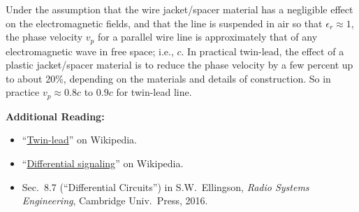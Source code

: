 Under the assumption that the wire jacket/spacer material has a negligible effect on the electromagnetic fields, and that the line is suspended in air so that 
$\epsilon_r\approx 1$, the phase velocity $v_p$ for a parallel wire line is approximately that of any electromagnetic wave in free space; i.e., $c$.  In practical twin-lead, the effect of a plastic jacket/spacer material is to reduce the phase velocity by a few percent up to about 20\%, depending on the materials and details of construction.  So in practice $v_p\approx 0.8c$ to $0.9c$ for twin-lead line.  


{\bf Additional Reading:}
\begin{itemize}
\item ``\href{https://en.wikipedia.org/wiki/Twin-lead}{Twin-lead}'' on Wikipedia.
\item ``\href{https://en.wikipedia.org/wiki/Differential_signaling}{Differential signaling}'' on Wikipedia.
\item Sec.~8.7 (``Differential Circuits'') in S.W.~Ellingson, \emph{Radio Systems Engineering}, Cambridge Univ.\ Press, 2016. 
\end{itemize}
 

